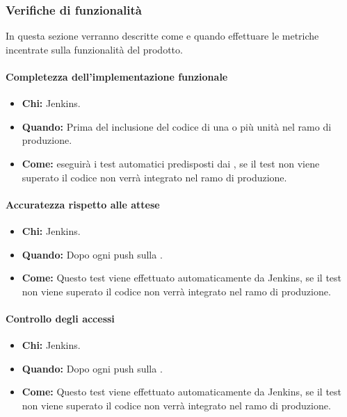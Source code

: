 \newpage
\subsubsection{Verifiche di funzionalità}
In questa sezione verranno descritte come e quando effettuare le metriche incentrate sulla funzionalità del prodotto.

\paragraph{Completezza dell'implementazione funzionale}
\begin{itemize}
\item \textbf{Chi:} Jenkins.
\item \textbf{Quando:} Prima del inclusione del codice di una o più unità nel ramo di produzione.
\item \textbf{Come:}  eseguirà i test automatici predisposti dai \ProgrP, se il test non viene superato il codice non verrà integrato nel ramo di produzione.
\end{itemize}

\paragraph{Accuratezza rispetto alle attese}
\begin{itemize}
\item \textbf{Chi:} Jenkins.
\item \textbf{Quando:} Dopo ogni push sulla .
\item \textbf{Come:} Questo test viene effettuato automaticamente da Jenkins, se il test non viene superato il codice non verrà integrato nel ramo di produzione.
\end{itemize}

\paragraph{Controllo degli accessi}
\begin{itemize}
\item \textbf{Chi:} Jenkins.
\item \textbf{Quando:} Dopo ogni push sulla .
\item \textbf{Come:} Questo test viene effettuato automaticamente da Jenkins, se il test non viene superato il codice non verrà integrato nel ramo di produzione.
\end{itemize}